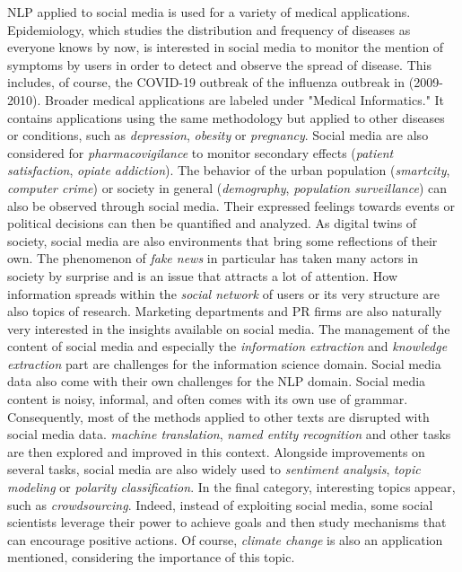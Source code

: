 NLP applied to social media is used for a variety of medical applications.
Epidemiology, which studies the distribution and frequency of diseases as everyone knows by now,
is interested in social media to monitor the mention of symptoms by users in order to detect and observe the spread of disease.
This includes, of course, the COVID-19 outbreak of the influenza outbreak in (2009-2010).
Broader medical applications are labeled under "Medical Informatics."
It contains applications using the same methodology but applied to other diseases or conditions, such as \emph{depression}, \emph{obesity} or \emph{pregnancy}.
Social media are also considered for \emph{pharmacovigilance} to monitor secondary effects (\emph{patient satisfaction}, \emph{opiate addiction}).
The behavior of the urban population (\emph{smartcity}, \emph{computer crime}) or society in general (\emph{demography}, \emph{population surveillance}) can also be observed through social media.
Their expressed feelings towards events or political decisions can then be quantified and analyzed.
As digital twins of society, social media are also environments that bring some reflections of their own.
The phenomenon of \emph{fake news} in particular has taken many actors in society by surprise and is an issue that attracts a lot of attention.
How information spreads within the \emph{social network} of users or its very structure are also topics of research.
Marketing departments and PR firms are also naturally very interested in the insights available on social media.
The management of the content of social media and especially the \emph{information extraction} and \emph{knowledge extraction} part
are challenges for the information science domain.
Social media data also come with their own challenges for the NLP domain.
Social media content is noisy, informal, and often comes with its own use of grammar.
Consequently, most of the methods applied to other texts are disrupted with social media data.
\emph{machine translation}, \emph{named entity recognition} and other tasks are then explored and improved in this context.
Alongside improvements on several tasks, social media are also widely used to \emph{sentiment analysis}, \emph{topic modeling} or \emph{polarity classification}.
In the final category, interesting topics appear, such as \emph{crowdsourcing}.
Indeed, instead of exploiting social media, some social scientists leverage their power to achieve goals and then study mechanisms that can encourage positive actions.
Of course, \emph{climate change} is also an application mentioned, considering the importance of this topic.

